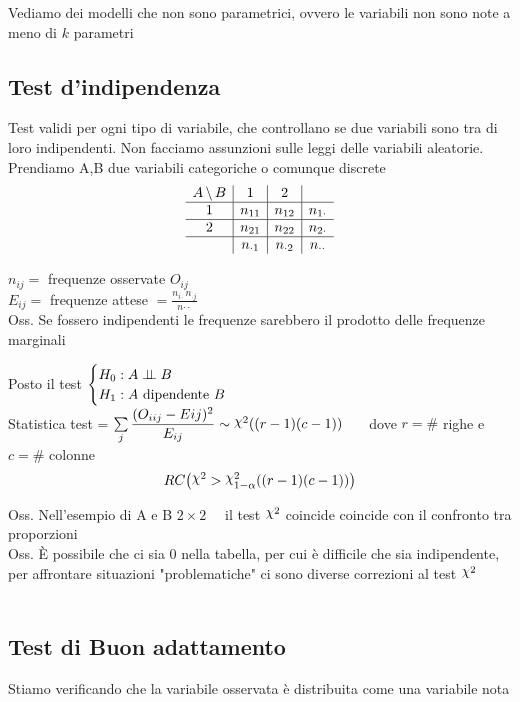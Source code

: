 

Vediamo dei modelli che non sono parametrici, ovvero le variabili non sono note a meno di $k$ parametri

\subsection{Test d'indipendenza}

Test validi per ogni tipo di variabile, che controllano se due variabili sono tra di loro indipendenti. Non facciamo assunzioni sulle leggi delle variabili aleatorie.\\

Prendiamo A,B due variabili categoriche o comunque discrete
\[
\begin{array}{c|c|c|c}
   A \,\backslash\, B  & 1 & 2 & \\
   \hline
   1  & n_{11} & n_{12} & n_{1\cdot}\\
   \hline
   2 & n_{21} & n_{22} & n_{2\cdot}\\
   \hline
   & n_{\cdot1} & n_{\cdot 2} & n_{\cdot \cdot}
\end{array}
\]

$n_{ij}=$ frequenze osservate $O_{ij}$\\
$E_{ij}=$ frequenze attese $=\frac{n_{ i \cdot}n_{\cdot j}}{n{\cdot\cdot}}$\\

Oss. Se fossero indipendenti le frequenze sarebbero il prodotto delle frequenze marginali 

Posto il test $\begin{cases}
    H_0 : A\perp \!\!\! \perp B\\
    H_1 : A \text{ dipendente } B
\end{cases}$\\

Statistica test = $\Sum{j}{}\frac{(O_{iij}-E{ij})^2}{E_{ij}}\sim \Chi^2 ((r-1)(c-1))$ \ \ \ dove $r=\#$ righe e $c=\#$ colonne
\[
RC \big(\Chi^2 > \Chi^2_{1-\alpha} ((r-1)(c-1))\big)
\]

Oss. Nell'esempio di A e B $2\times2$ \ \ il test $\Chi^2$ coincide coincide con il confronto tra proporzioni\\
Oss. È possibile che ci sia 0 nella tabella, per cui è difficile che sia indipendente, per affrontare situazioni "problematiche" ci sono diverse correzioni al test $\Chi^2$\\ \\


\subsection{Test di Buon adattamento}
Stiamo verificando che la variabile osservata è distribuita come una variabile nota\\

